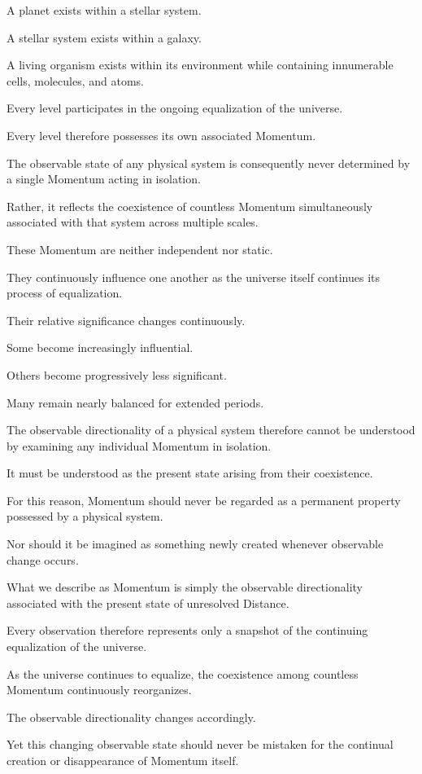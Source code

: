 A planet exists within a stellar system.

A stellar system exists within a galaxy.

A living organism exists within its environment while containing innumerable cells, molecules, and atoms.

Every level participates in the ongoing equalization of the universe.

Every level therefore possesses its own associated Momentum.

The observable state of any physical system is consequently never determined by a single Momentum acting in isolation.

Rather, it reflects the coexistence of countless Momentum simultaneously associated with that system across multiple scales.

These Momentum are neither independent nor static.

They continuously influence one another as the universe itself continues its process of equalization.

Their relative significance changes continuously.

Some become increasingly influential.

Others become progressively less significant.

Many remain nearly balanced for extended periods.

The observable directionality of a physical system therefore cannot be understood by examining any individual Momentum in isolation.

It must be understood as the present state arising from their coexistence.

For this reason, Momentum should never be regarded as a permanent property possessed by a physical system.

Nor should it be imagined as something newly created whenever observable change occurs.

What we describe as Momentum is simply the observable directionality associated with the present state of unresolved Distance.

Every observation therefore represents only a snapshot of the continuing equalization of the universe.

As the universe continues to equalize, the coexistence among countless Momentum continuously reorganizes.

The observable directionality changes accordingly.

Yet this changing observable state should never be mistaken for the continual creation or disappearance of Momentum itself.

